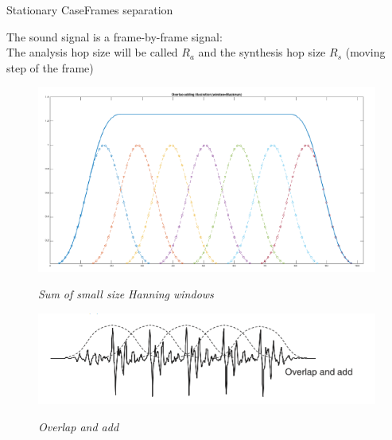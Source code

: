 \documentclass{bredelebeamer}
\begin{document}
\begin{frame}{Stationary Case}{Frames separation}

The sound signal is  a frame-by-frame signal: \\
The analysis hop size will be called $R_a$ and the synthesis hop size $R_s$ (moving step of the frame)
\begin{figure}

	{\includegraphics[scale=0.25]{overlap2.png}}
	\caption{\it Sum of small size Hanning windows}
\end{figure}
\begin{figure}
	{\includegraphics[scale=0.25]{overlap1.png}}
	\caption{\it Overlap and add}
\end{figure}
\end{frame}
\end{document}
